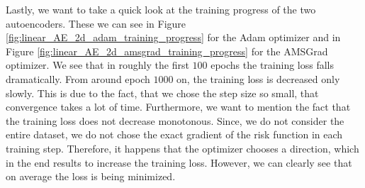 Lastly, we want to take a quick look at the training progress of the two autoencoders. These we can see in Figure \ref{fig:linear_AE_2d_adam_training_progress} for the Adam optimizer and in Figure \ref{fig:linear_AE_2d_amsgrad_training_progress} for the AMSGrad optimizer. We see that in roughly the first $100$ epochs the training loss falls dramatically. From around epoch $1000$ on, the training loss is decreased only slowly. This is due to the fact, that we chose the step size so small, that convergence takes a lot of time. Furthermore, we want to mention the fact that the training loss does not decrease monotonous. Since, we do not consider the entire dataset, we do not chose the exact gradient of the risk function in each training step. Therefore, it happens that the optimizer chooses a direction, which in the end results to increase the training loss. However, we can clearly see that on average the loss is being minimized.

